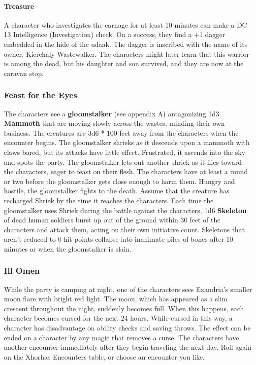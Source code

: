 \documentclass[10pt,a4,twoside,twocolumn,openany,nodeprecatedcode]{dndbook}
\begin{document}
\paragraph{Treasure}
A character who investigates the carnage for at least 10 minutes can make a DC 13 Intelligence (Investigation) check. On a success, they find a +1 dagger embedded in the hide of the udaak. The dagger is inscribed with the name of its owner, Kierchaly Wastewalker. The characters might later learn that this warrior is among the dead, but his daughter and son survived, and they are now at the caravan stop.
\subsubsection{Feast for the Eyes}
The characters see a \textbf{gloomstalker} (see appendix A) antagonizing 1d3 \textbf{Mammoth} that are moving slowly across the wastes, minding their own business. The creatures are 3d6 * 100 feet away from the characters when the encounter begins.
The gloomstalker shrieks as it descends upon a mammoth with claws bared, but its attacks have little effect. Frustrated, it ascends into the sky and spots the party. The gloomstalker lets out another shriek as it flies toward the characters, eager to feast on their flesh. The characters have at least a round or two before the gloomstalker gets close enough to harm them. Hungry and hostile, the gloomstalker fights to the death. Assume that the creature has recharged Shriek by the time it reaches the characters.
Each time the gloomstalker uses Shriek during the battle against the characters, 1d6 \textbf{Skeleton} of dead human soldiers burst up out of the ground within 30 feet of the characters and attack them, acting on their own initiative count. Skeletons that aren't reduced to 0 hit points collapse into inanimate piles of bones after 10 minutes or when the gloomstalker is slain.
\subsubsection{Ill Omen}
While the party is camping at night, one of the characters sees Exandria's smaller moon flare with bright red light. The moon, which has appeared as a slim crescent throughout the night, suddenly becomes full. When this happens, each character becomes cursed for the next 24 hours. While cursed in this way, a character has disadvantage on ability checks and saving throws. The effect can be ended on a character by any magic that removes a curse.
The characters have another encounter immediately after they begin traveling the next day. Roll again on the Xhorhas Encounters table, or choose an encounter you like.
\end{document}
